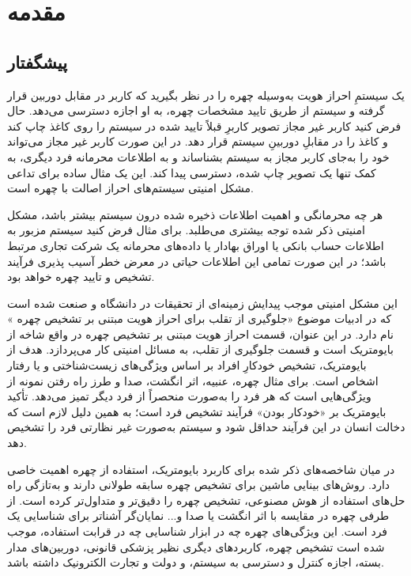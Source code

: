 
\chapter{مقدمه}
\thispagestyle{empty}
\section{پیشگفتار}
یک سیستمِ احراز هویت به‌وسیله چهره را در نظر بگیرید که کاربر در مقابل دوربین قرار گرفته و سیستم از طریق تایید مشخصات چهره، به او اجازه دسترسی می‌دهد. حال فرض کنید کاربر غیر مجاز تصویر کاربرِ قبلاً تایید شده در سیستم را روی کاغذ چاپ کند و کاغذ را در مقابلِ دوربینِ سیستم قرار دهد. در این صورت کاربر غیر مجاز می‌تواند خود را به‌جای کاربر مجاز به سیستم بشناساند و به اطلاعات محرمانه فرد دیگری، به کمک تنها یک تصویر چاپ شده، دسترسی پیدا کند. این یک مثال ساده برای تداعی مشکل امنیتی سیستم‌های احراز اصالت با چهره است.

هر چه محرمانگی و اهمیت اطلاعات ذخیره شده درون سیستم بیشتر باشد، مشکل امنیتی ذکر شده توجه بیشتری می‌طلبد. برای مثال فرض کنید سیستم مزبور به اطلاعات حساب بانکی یا اوراق بهادار یا داده‌های محرمانه یک شرکت تجاری مرتبط باشد؛ در این صورت تمامی این اطلاعات حیاتی در معرض خطر آسیب پذیری فرآیند تشخیص و تایید چهره خواهد بود.

این مشکل امنیتی موجب پیدایش زمینه‌ای از تحقیقات در دانشگاه و صنعت شده است که در ادبیات موضوع «جلوگیری از تقلب برای احراز هویت مبتنی بر تشخیص چهره
» نام دارد. در این عنوان، قسمت احراز هویت مبتنی بر تشخیص چهره در واقع شاخه از بایومتریک
   است و قسمت جلوگیری از تقلب، به مسائل امنیتی کار می‌پردازد.
هدف از بایومتریک، تشخیص خودکارِ افراد بر اساس ویژگی‌های زیست‌شناختی و یا رفتار اشخاص است. برای مثال چهره، عنبیه، اثر انگشت، صدا و طرز راه رفتن نمونه از ویژگی‌هایی است که هر فرد را به‌صورت منحصراً از فرد دیگر تمیز می‌دهد.  تأکید بایومتریک بر «خودکار بودن» فرآیند تشخیص فرد است؛ به همین دلیل لازم است که دخالت انسان در این فرآیند حداقل شود و سیستم به‌صورت غیر نظارتی
 فرد را تشخیص دهد.
 
در میان شاخصه‌های ذکر شده برای کاربرد بایومتریک، استفاده از چهره اهمیت خاصی دارد. روش‌های بینایی ماشین برای تشخیص چهره سابقه طولانی دارند و به‌تازگی راه حل‌های استفاده از هوش مصنوعی، تشخیص چهره را دقیق‌تر و متداول‌تر کرده است. از طرفی چهره در مقایسه با اثر انگشت یا صدا و... نمایان‌گر آشناتر برای شناسایی یک فرد است. این ویژگی‌های چهره چه در ابزار شناسایی چه در قرابت استفاده، موجب شده است تشخیص چهره، کاربردهای دیگری نظیر پزشکی قانونی، دوربین‌های مدار بسته، اجازه کنترل و دسترسی به سیستم، و دولت و تجارت الکترونیک داشته باشد.


